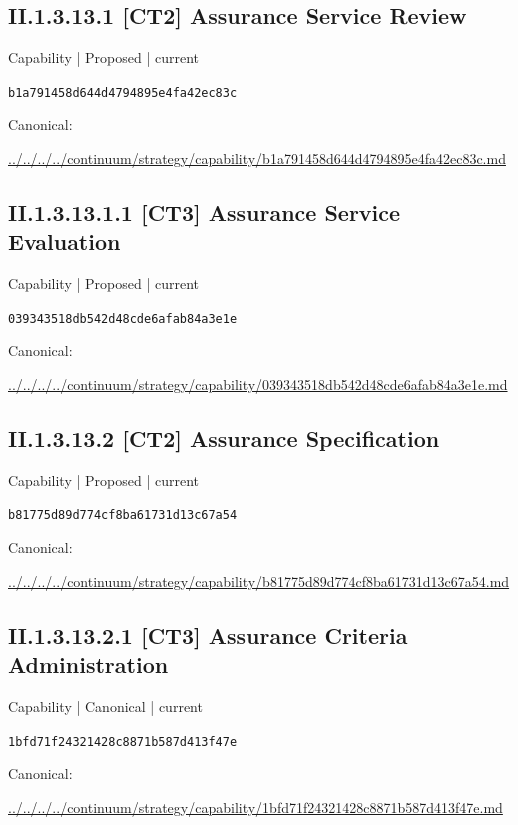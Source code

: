 \documentclass[10pt,a4paper]{article}
\begin{document}
\subsection*{II.1.3.13.1 [CT2] Assurance Service Review}
{\small Capability | Proposed | current}\par
\texttt{b1a791458d644d4794895e4fa42ec83c}\par
Canonical: \par
{\footnotesize\url{../../../../continuum/strategy/capability/b1a791458d644d4794895e4fa42ec83c.md}}\par
\subsection*{II.1.3.13.1.1 [CT3] Assurance Service Evaluation}
{\small Capability | Proposed | current}\par
\texttt{039343518db542d48cde6afab84a3e1e}\par
Canonical: \par
{\footnotesize\url{../../../../continuum/strategy/capability/039343518db542d48cde6afab84a3e1e.md}}\par
\subsection*{II.1.3.13.2 [CT2] Assurance Specification}
{\small Capability | Proposed | current}\par
\texttt{b81775d89d774cf8ba61731d13c67a54}\par
Canonical: \par
{\footnotesize\url{../../../../continuum/strategy/capability/b81775d89d774cf8ba61731d13c67a54.md}}\par
\subsection*{II.1.3.13.2.1 [CT3] Assurance Criteria Administration}
{\small Capability | Canonical | current}\par
\texttt{1bfd71f24321428c8871b587d413f47e}\par
Canonical: \par
{\footnotesize\url{../../../../continuum/strategy/capability/1bfd71f24321428c8871b587d413f47e.md}}\par
\end{document}
